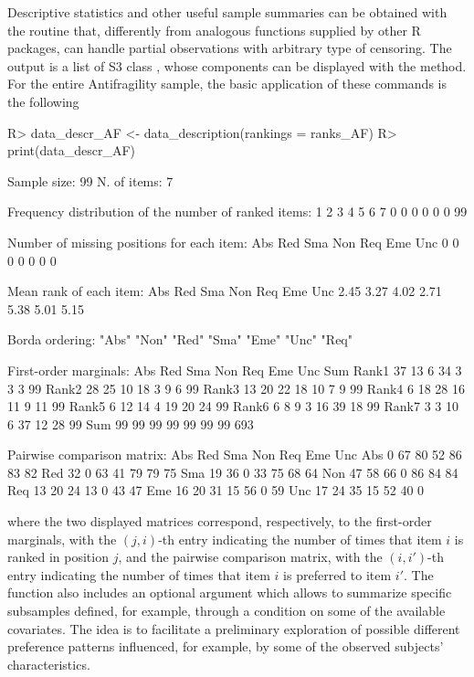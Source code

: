 Descriptive statistics and other useful sample summaries can be obtained with the  routine that, differently from analogous functions supplied by other \textsf{R} packages, can handle partial observations with arbitrary type of censoring. The output is a list of S3 class , whose components can be displayed with the  method.
For the entire Antifragility sample, the basic application of these commands is the following
\begin{example}
R> data_descr_AF <- data_description(rankings = ranks_AF)
R> print(data_descr_AF)

Sample size: 99
N. of items: 7

Frequency distribution of the number of ranked items:
 1  2  3  4  5  6  7
 0  0  0  0  0  0 99

Number of missing positions for each item:
Abs Red Sma Non Req Eme Unc
  0   0   0   0   0   0   0

Mean rank of each item:
 Abs  Red  Sma  Non  Req  Eme  Unc
2.45 3.27 4.02 2.71 5.38 5.01 5.15

Borda ordering:
"Abs" "Non" "Red" "Sma" "Eme" "Unc" "Req"

First-order marginals:
      Abs Red Sma Non Req Eme Unc Sum
Rank1  37  13   6  34   3   3   3  99
Rank2  28  25  10  18   3   9   6  99
Rank3  13  20  22  18  10   7   9  99
Rank4   6  18  28  16  11   9  11  99
Rank5   6  12  14   4  19  20  24  99
Rank6   6   8   9   3  16  39  18  99
Rank7   3   3  10   6  37  12  28  99
Sum    99  99  99  99  99  99  99 693

Pairwise comparison matrix:
    Abs Red Sma Non Req Eme Unc
Abs   0  67  80  52  86  83  82
Red  32   0  63  41  79  79  75
Sma  19  36   0  33  75  68  64
Non  47  58  66   0  86  84  84
Req  13  20  24  13   0  43  47
Eme  16  20  31  15  56   0  59
Unc  17  24  35  15  52  40   0
\end{example}
where the two displayed matrices correspond, respectively, to
the first-order marginals, with the $(j,i)$-th entry indicating the number of times that item $i$ is ranked in position $j$, and
the pairwise comparison matrix, with the $(i,i')$-th entry indicating the number of times that item $i$ is preferred to item $i'$.
The function  also includes an optional  argument which allows to summarize specific subsamples defined, for example, through a condition on some of the available covariates. The idea is to facilitate a preliminary exploration of possible different preference patterns influenced, for example, by some of the observed subjects' characteristics.

